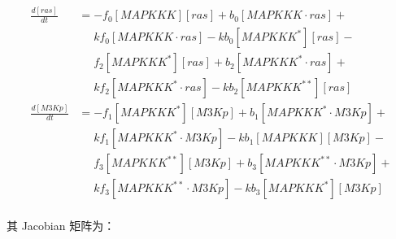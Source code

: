 \begin{equation*}
  \begin{align*}
    \frac{d[ras]}{dt} &= -f_{0}[MAPKKK][ras] + b_{0}[MAPKKK\cdot{}ras] +\\
    &\phantom{=} kf_{0}[MAPKKK\cdot{}ras] - kb_{0}[MAPKKK^{*}][ras] -\\
    &\phantom{=} f_{2}[MAPKKK^{*}][ras] + b_{2}[MAPKKK^{*}\cdot{}ras] +\\
    &\phantom{=} kf_{2}[MAPKKK^{*}\cdot{}ras] - kb_{2}[MAPKKK^{**}][ras]\\
    \frac{d[M3Kp]}{dt} &= -f_{1}[MAPKKK^{*}][M3Kp] + b_{1}[MAPKKK^{*}\cdot{}M3Kp] +\\
    &\phantom{=} kf_{1}[MAPKKK^{*}\cdot{}M3Kp] - kb_{1}[MAPKKK][M3Kp] -\\
    &\phantom{=} f_{3}[MAPKKK^{**}][M3Kp] + b_{3}[MAPKKK^{**}\cdot{}M3Kp] +\\
    &\phantom{=} kf_{3}[MAPKKK^{**}\cdot{}M3Kp] - kb_{3}[MAPKKK^{*}][M3Kp]\\
  \end{align*}
\end{equation*}
\normalsize

其 Jacobian 矩阵为：

